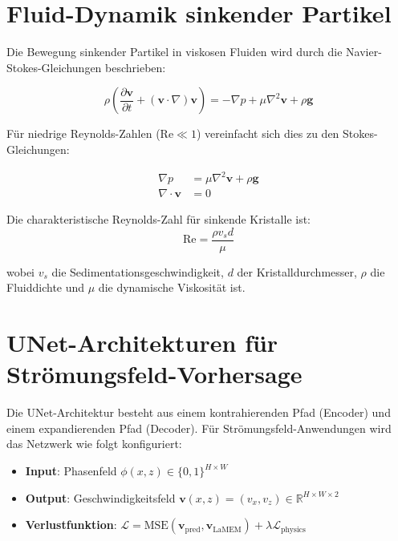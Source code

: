 \documentclass[12pt,twoside,openright]{scrreprt}
\newcommand{\grad}{\nabla}
\newcommand{\divg}{\nabla \cdot}
\newcommand{\laplacian}{\nabla^2}
\theoremstyle{definition}
\theoremstyle{plain}
\newcommand{\reynolds}{\text{Re}}
\begin{document}
	\section{Fluid-Dynamik sinkender Partikel}
	
	Die Bewegung sinkender Partikel in viskosen Fluiden wird durch die Navier-Stokes-Gleichungen beschrieben:
	
	\begin{equation}
		\rho \left( \frac{\partial \mathbf{v}}{\partial t} + (\mathbf{v} \cdot \grad) \mathbf{v} \right) = -\grad p + \mu \laplacian \mathbf{v} + \rho \mathbf{g}
	\end{equation}
	
	Für niedrige Reynolds-Zahlen ($\reynolds \ll 1$) vereinfacht sich dies zu den Stokes-Gleichungen:
	
	\begin{align}
		\grad p &= \mu \laplacian \mathbf{v} + \rho \mathbf{g} \\
		\divg \mathbf{v} &= 0
	\end{align}
	
	Die charakteristische Reynolds-Zahl für sinkende Kristalle ist:
	\begin{equation}
		\reynolds = \frac{\rho v_s d}{\mu}
	\end{equation}
	
	wobei $v_s$ die Sedimentationsgeschwindigkeit, $d$ der Kristalldurchmesser, $\rho$ die Fluiddichte und $\mu$ die dynamische Viskosität ist.
	
	\section{UNet-Architekturen für Strömungsfeld-Vorhersage}
	
	Die UNet-Architektur besteht aus einem kontrahierenden Pfad (Encoder) und einem expandierenden Pfad (Decoder). Für Strömungsfeld-Anwendungen wird das Netzwerk wie folgt konfiguriert:
	
	\begin{itemize}
		\item \textbf{Input}: Phasenfeld $\phi(x,z) \in \{0,1\}^{H \times W}$ 
		\item \textbf{Output}: Geschwindigkeitsfeld $\mathbf{v}(x,z) = (v_x, v_z) \in \mathbb{R}^{H \times W \times 2}$
		\item \textbf{Verlustfunktion}: $\mathcal{L} = \text{MSE}(\mathbf{v}_{\text{pred}}, \mathbf{v}_{\text{LaMEM}}) + \lambda \mathcal{L}_{\text{physics}}$
	\end{itemize}
	
\end{document}
